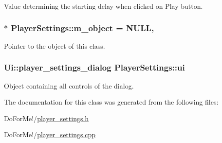 Value determining the starting delay when clicked on Play button. 

\hypertarget{class_player_settings_ab5a1cadfa2102bf207c5c8f89aba8a9b}{
\subsubsection[{m\-\_\-object}]{ $\ast$ Player\-Settings\-::m\-\_\-object = N\-U\-L\-L\hspace{0.3cm}{\ttfamily [static]}, {\ttfamily [private]}}}\label{class_player_settings_ab5a1cadfa2102bf207c5c8f89aba8a9b}


Pointer to the object of this class. 

\hypertarget{class_player_settings_a165ee7d40a5e19f9930ad852efaecf09}{
\subsubsection[{ui}]{\setlength{\rightskip}{0pt plus 5cm}Ui\-::player\-\_\-settings\-\_\-dialog Player\-Settings\-::ui\hspace{0.3cm}{\ttfamily [private]}}}\label{class_player_settings_a165ee7d40a5e19f9930ad852efaecf09}


Object containing all controls of the dialog. 



The documentation for this class was generated from the following files\-:\begin{DoxyCompactItemize}
\item 
Do\-For\-Me!/\hyperlink{player__settings_8h}{player\-\_\-settings.\-h}\item 
Do\-For\-Me!/\hyperlink{player__settings_8cpp}{player\-\_\-settings.\-cpp}\end{DoxyCompactItemize}
